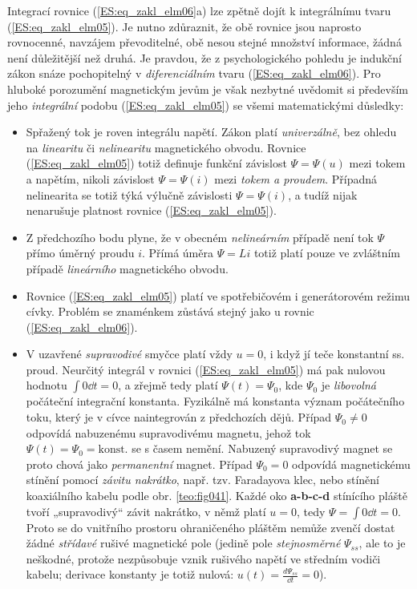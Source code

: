     Integrací rovnice (\ref{ES:eq_zakl_elm06}a) lze zpětně dojít k integrálnímu tvaru
    (\ref{ES:eq_zakl_elm05}). Je nutno zdůraznit, že obě rovnice jsou naprosto rovnocenné, navzájem
    převoditelné, obě nesou stejné množství informace, žádná není důležitější než druhá. Je
    pravdou, že z psychologického pohledu je indukční zákon snáze pochopitelný v
    \emph{diferenciálním} tvaru (\ref{ES:eq_zakl_elm06}). Pro hluboké porozumění magnetickým jevům
    je však nezbytné uvědomit si především jeho \emph{integrální} podobu (\ref{ES:eq_zakl_elm05})
    se všemi matematickými důsledky:
    \begin{itemize}
      \item Spřažený tok je roven integrálu napětí. Zákon platí \emph{univerzálně}, bez ohledu na
            \emph{linearitu} či \emph{nelinearitu} magnetického obvodu. Rovnice
            (\ref{ES:eq_zakl_elm05}) totiž definuje funkční závislost \(\Psi=\Psi(u)\) mezi tokem a
            napětím, nikoli závislost \(\Psi=\Psi(i)\) mezi \emph{tokem a proudem}.  Případná
            nelinearita se totiž týká výlučně závislosti \(\Psi=\Psi(i)\), a tudíž nijak nenarušuje
            platnost rovnice (\ref{ES:eq_zakl_elm05}).
      \item Z předchozího bodu plyne, že v obecném \emph{nelineárním} případě není tok \(\Psi\)
            přímo úměrný proudu \(i\). Přímá úměra \(\Psi = Li\) totiž platí pouze ve zvláštním
            případě \emph{lineárního} magnetického obvodu.
      \item Rovnice (\ref{ES:eq_zakl_elm05}) platí ve spotřebičovém i generátorovém režimu cívky.
            Problém se znaménkem zůstává stejný jako u rovnic (\ref{ES:eq_zakl_elm06}).
      \item V uzavřené \emph{supravodivé} smyčce platí vždy \(u = 0\), i když jí teče konstantní
            ss. proud. Neurčitý integrál v rovnici (\ref{ES:eq_zakl_elm05}) má pak nulovou hodnotu
            \(\int0\dd{t}=0\), a zřejmě tedy platí \(\Psi(t)=\Psi_0\), kde \(\Psi_0\) je
            \emph{libovolná} počáteční integrační konstanta. Fyzikálně má konstanta význam
            počátečního toku, který je v cívce naintegrován z předchozích dějů. Případ
            \(\Psi_0\neq0\) odpovídá nabuzenému supravodivému magnetu, jehož tok \(\Psi(t)=\Psi_0
            = \text{konst.}\) se s časem nemění. Nabuzený supravodivý magnet se proto chová jako
            \emph{permanentní} magnet. Případ \(\Psi_0 = 0\) odpovídá magnetickému stínění pomocí
            \emph{závitu nakrátko}, např. tzv. Faradayova klec, nebo stínění koaxiálního kabelu
            podle obr. \ref{teo:fig041}. Každé oko \textbf{a-b-c-d} stínícího pláště
            tvoří „supravodivý“ závit nakrátko, v němž platí \(u = 0\), tedy \(\Psi=\int0\dd{t}=0\).
            Proto se do vnitřního prostoru ohraničeného pláštěm nemůže zvenčí dostat žádné
            \emph{střídavé} rušivé magnetické pole (jedině pole \emph{stejnosměrné} \(\Psi_{ss}\),
            ale to je neškodné, protože nezpůsobuje vznik rušivého napětí ve středním vodiči
            kabelu; derivace konstanty je totiž nulová: \(u(t)=\frac{d\Psi_{ss}}{\dd{t}}=0\)).
    \end{itemize}

